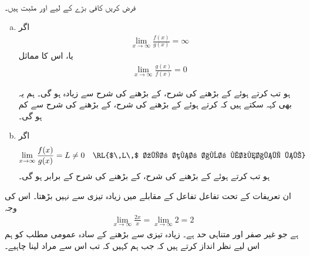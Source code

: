 \\
فرض کریں کافی بڑے  کے لیے  اور  مثبت ہیں۔
\begin{enumerate}[a.]
\item
اگر 
\begin{align*}
\lim_{x\to\infty}\frac{f(x)}{g(x)}=\infty
\end{align*}
یا، اس کا مماثل
\begin{align*}
\lim_{x\to\infty}\frac{g(x)}{f(x)}=0
\end{align*}

ہو تب   کرتے ہوئے  کے بڑھنے کی شرح،  کے بڑھنے کی شرح سے زیادہ ہو گی۔ ہم یہ بھی کہہ سکتے ہیں کہ  کرتے ہوئے  کے بڑھنے کی شرح،  کے بڑھنے کی شرح سے کم ہو گی۔
\item
اگر
\begin{align*}
\lim_{x\to\infty}\frac{f(x)}{g(x)}&=L\ne 0&&\text{\RL{$\,L\,$ غیر صفر اور متناہی ہے}}
\end{align*}
ہو تب  کرتے ہوئے  کے بڑھنے کی شرح،   کے بڑھنے کی شرح کے برابر ہو گی۔
\end{enumerate}

ان تعریفات کے تحت  تفاعل  تفاعل   کے مقابلے میں زیادہ تیزی سے نہیں بڑھتا۔ اس کی وجہ 
\begin{align*}
\lim_{x\to\infty}\frac{2x}{x}=\lim_{x\to \infty}2=2
\end{align*}
ہے  جو غیر صفر اور متناہی حد ہے۔ زیادہ تیزی سے بڑھنے کے   سادہ عمومی مطلب کو ہم اس لیے نظر انداز  کرتے ہیں کہ جب ہم کہیں کہ  تب اس سے مراد  لینا چاہیے۔

